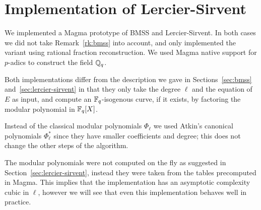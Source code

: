 \section{Implementation of Lercier-Sirvent}
We implemented a Magma prototype of BMSS and Lercier-Sirvent. In both
cases we did not take Remark~\ref{rk:bmss} into account, and only
implemented the variant using rational fraction reconstruction. We
used Magma native support for $p$-adics to construct the field $\mathbb{Q}_q$.

Both implementations differ from the description we gave in
Sections~\ref{sec:bmss} and~\ref{sec:lercier-sirvent} in that they
only take the degree $\ell$ and the equation of $E$ as input, and
compute an $\mathbb{F}_q$-isogenous curve, if it exists, by factoring the
modular polynomial in $\mathbb{F}_q[X]$.

Instead of the classical modular polynomials $\Phi_\ell$ we used
Atkin's canonical polynomials $\Phi^\ast_\ell$ since they have smaller
coefficients and degree; this does not change the other steps of the
algorithm. 

The modular polynomials were not computed on the fly as suggested in
Section~\ref{sec:lercier-sirvent}, instead they were taken from the
tables precomputed in Magma. This implies that the implementation has
an asymptotic complexity cubic in $\ell$, however we will see that
even this implementation behaves well in practice.


%
